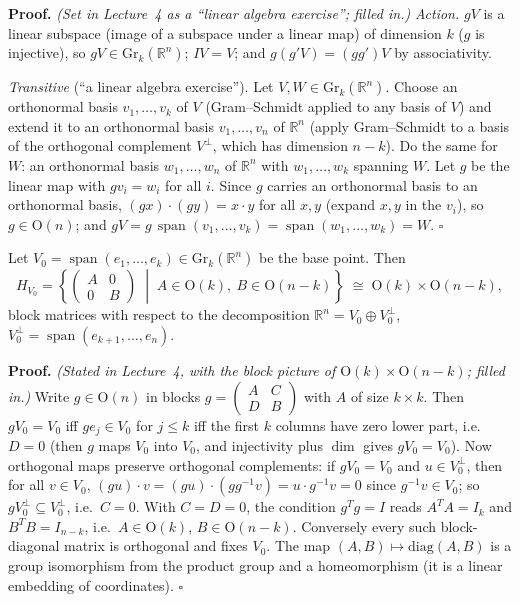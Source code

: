 \documentclass[11pt]{report}
\makeatletter
\newcounter{thmcounter}[section]
\renewenvironment{proof}[1][Proof]{\noindent\textbf{#1.} }{\hfill$\square$\par\vspace{5pt}}
\newcommand{\thmlabel}[1]{\edef\@currentlabel{\arabic{section}.\arabic{thmcounter}}\label{#1}}
\newcommand{\Ogp}{\mathrm{O}}
\newcommand{\Gr}{\mathrm{Gr}}
\DeclareMathOperator{\Span}{span}
\newcommand{\leeref}[1]{\par\smallskip{\raggedleft\footnotesize\textsc{Lee}:\ #1\par}}
\makeatother
\begin{document}
\begin{proof}
\textit{(Set in Lecture~4 as a ``linear algebra exercise''; filled in.)} \emph{Action.} $gV$ is a linear subspace (image of a subspace under a linear map) of dimension $k$ ($g$ is injective), so $gV \in \Gr_k(\mathbb{R}^n)$; $IV = V$; and $g(g'V) = (gg')V$ by associativity.

\emph{Transitive} (``a linear algebra exercise''). Let $V, W \in \Gr_k(\mathbb{R}^n)$. Choose an orthonormal basis $v_1, \ldots, v_k$ of $V$ (Gram--Schmidt applied to any basis of $V$) and extend it to an orthonormal basis $v_1, \ldots, v_n$ of $\mathbb{R}^n$ (apply Gram--Schmidt to a basis of the orthogonal complement $V^\perp$, which has dimension $n - k$). Do the same for $W$: an orthonormal basis $w_1, \ldots, w_n$ of $\mathbb{R}^n$ with $w_1, \ldots, w_k$ spanning $W$. Let $g$ be the linear map with $g v_i = w_i$ for all $i$. Since $g$ carries an orthonormal basis to an orthonormal basis, $(gx) \cdot (gy) = x \cdot y$ for all $x, y$ (expand $x, y$ in the $v_i$), so $g \in \Ogp(n)$; and $gV = g\,\Span(v_1, \ldots, v_k) = \Span(w_1, \ldots, w_k) = W$.
\end{proof}

\begin{propbox}\thmlabel{prop:grassmann-isotropy}
Let $V_0 = \Span(e_1, \ldots, e_k) \in \Gr_k(\mathbb{R}^n)$ be the base point. Then
\[
H_{V_0} = \left\{ \begin{pmatrix} A & 0 \\ 0 & B \end{pmatrix} \;\middle|\; A \in \Ogp(k),\ B \in \Ogp(n-k) \right\} \;\cong\; \Ogp(k) \times \Ogp(n-k),
\]
block matrices with respect to the decomposition $\mathbb{R}^n = V_0 \oplus V_0^\perp$, $V_0^\perp = \Span(e_{k+1}, \ldots, e_n)$.
\leeref{Example 21.21}
\end{propbox}

\begin{proof}
\textit{(Stated in Lecture~4, with the block picture of $\Ogp(k) \times \Ogp(n-k)$; filled in.)} Write $g \in \Ogp(n)$ in blocks $g = \begin{pmatrix} A & C \\ D & B \end{pmatrix}$ with $A$ of size $k \times k$. Then $gV_0 = V_0$ iff $g e_j \in V_0$ for $j \le k$ iff the first $k$ columns have zero lower part, i.e.\ $D = 0$ (then $g$ maps $V_0$ into $V_0$, and injectivity plus $\dim$ gives $gV_0 = V_0$). Now orthogonal maps preserve orthogonal complements: if $gV_0 = V_0$ and $u \in V_0^\perp$, then for all $v \in V_0$, $(gu) \cdot v = (gu) \cdot (g g^{-1} v) = u \cdot g^{-1}v = 0$ since $g^{-1}v \in V_0$; so $g V_0^\perp \subseteq V_0^\perp$, i.e.\ $C = 0$. With $C = D = 0$, the condition $g^T g = I$ reads $A^T A = I_k$ and $B^T B = I_{n-k}$, i.e.\ $A \in \Ogp(k)$, $B \in \Ogp(n-k)$. Conversely every such block-diagonal matrix is orthogonal and fixes $V_0$. The map $(A, B) \mapsto \mathrm{diag}(A, B)$ is a group isomorphism from the product group and a homeomorphism (it is a linear embedding of coordinates).
\end{proof}
\end{document}
